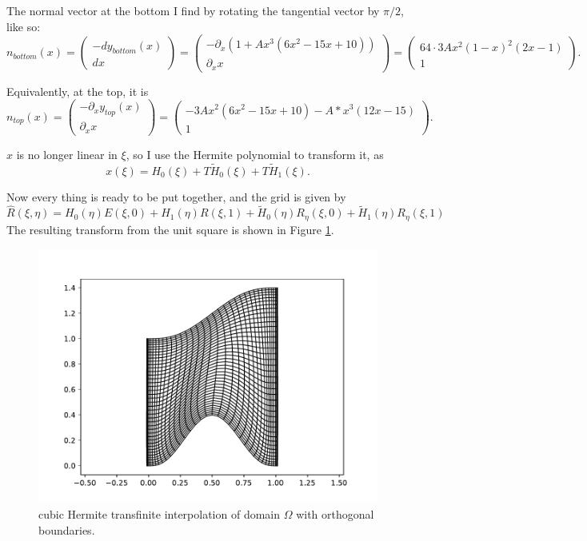 \documentclass[aps, 12pt]{revtex4}
\begin{document}
The normal vector at the bottom I find by rotating the tangential vector by $\pi/2$, like so:
\begin{equation*}
    n_{bottom}(x) = \begin{pmatrix}
        -dy_{bottom}(x) \\
        dx
    \end{pmatrix} = \begin{pmatrix}
        -\partial_x (1+Ax^3(6x^2-15x+10)) \\ \partial_x x
    \end{pmatrix} = \begin{pmatrix}
        64\cdot 3Ax^2(1-x)^2(2x-1) \\ 1
    \end{pmatrix}.
\end{equation*}

Equivalently, at the top, it is
\begin{equation*}
    n_{top}(x) = \begin{pmatrix}
        -\partial_xy_{top}(x) \\ \partial_xx
    \end{pmatrix} = \begin{pmatrix}
        -3Ax^2(6x^2 - 15x + 10) - A*x^3(12x - 15) \\ 1
    \end{pmatrix}.
\end{equation*}

$x$ is no longer linear in $\xi$, so I use the Hermite polynomial to transform it, as
\begin{equation*}
    x(\xi) = H_0(\xi) + T\tilde{H}_0(\xi) + T\tilde{H}_1(\xi).
\end{equation*}

Now every thing is ready to be put together, and the grid is given by
\begin{equation*}
    \hat{R}(\xi, \eta) = H_0(\eta)E(\xi, 0) + H_1(\eta)R(\xi, 1) + \tilde{H}_0(\eta)R_{\eta}(\xi, 0) + \tilde{H}_1(\eta)R_{\eta}(\xi, 1)
\end{equation*}
The resulting transform from the unit square is shown in Figure \ref{fig:tfi_orth}.

\begin{figure}
    \includegraphics[width=0.8\linewidth]{orthogonal.pdf}
    \caption{cubic Hermite transfinite interpolation of domain $\Omega$ with orthogonal boundaries.}
    \label{fig:tfi_orth}
\end{figure}
\end{document}
